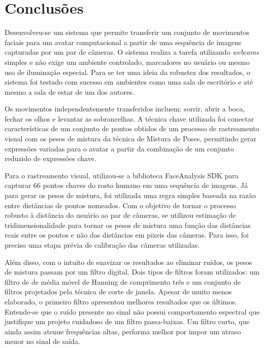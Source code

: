 \chapter{Conclusões}

\label{CapConclusoes}

Desenvolveu-se um sistema que permite transferir um conjunto de movimentos
faciais para um avatar computacional a partir de uma sequência de imagens
capturadas por um par de câmeras. O sistema realiza a tarefa utilizando
\textit{webcams} simples e não exige um ambiente controlado, marcadores no
usuário ou mesmo uso de iluminação especial. Para se ter uma ideia da robustez
dos resultados, o sistema foi testado com sucesso em ambientes como uma sala de
escritório e até mesmo a sala de estar de um dos autores.

Os movimentos independentemente transferidos incluem: sorrir, abrir a boca,
fechar os olhos e levantar as sobrancelhas. A técnica chave utilizada foi
conectar características de um conjunto de pontos obtidos de um processo de
rastreamento visual com os pesos de mistura da técnica de Mistura de Poses,
permitindo gerar expressões variadas para o avatar a partir da combinação de um
conjunto reduzido de expressões chave. 

Para o rastreamento visual, utilizou-se a biblioteca FaceAnalysis SDK para
capturar 66 pontos chaves do rosto humano em uma sequência de imagens. Já para
gerar os pesos de mistura, foi utilizada uma regra simples baseada na razão
entre distâncias de pontos nomeados. Com o objetivo de tornar o processo robusto
à distância do usuário ao par de câmeras, se utilizou estimação de
tridimensionalidade para tornar os pesos de mistura uma função das distâncias
reais entre os pontos e não das distâncias em pixeis das câmeras. Para isso, foi
preciso uma etapa prévia de calibração das câmeras utilizadas.

Além disso, com o intuito de suavizar os resultados ao eliminar ruídos, os pesos
de mistura passam por um filtro digital. Dois tipos de filtros foram utilizados:
um filtro de de média móvel de Hanning de comprimento três e um conjunto de
filtros projetados pela técnica de corte de janela.  Apesar de muito menos
elaborado, o primeiro filtro apresentou melhores resultados que os últimos.
Entende-se que o ruído presente no sinal não possui comportamento espectral que
justifique um projeto cuidadoso de um filtro passa-baixas. Um filtro curto, que
ainda assim atenue frequências altas, performa melhor por impor um atraso menor
no sinal de saída.

